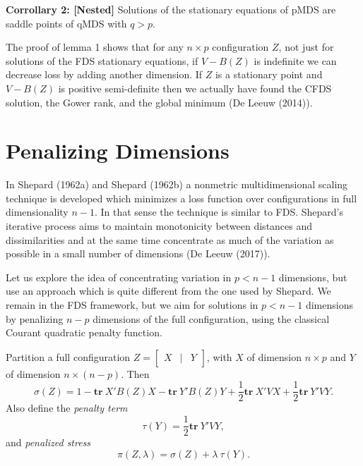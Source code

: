 \documentclass[
  12pt,
]{article}
\begin{document}
\textbf{Corrollary 2: {[}Nested{]}} Solutions of the stationary
equations of pMDS are saddle points of qMDS with \(q>p\).

The proof of lemma 1 shows that for any \(n\times p\) configuration
\(Z\), not just for solutions of the FDS stationary equations, if
\(V-B(Z)\) is indefinite we can decrease loss by adding another
dimension. If \(Z\) is a stationary point and \(V-B(Z)\) is positive
semi-definite then we actually have found the CFDS solution, the Gower
rank, and the global minimum (De Leeuw (2014)).

\section{Penalizing Dimensions}\label{penalizing-dimensions}

In Shepard (1962a) and Shepard (1962b) a nonmetric multidimensional
scaling technique is developed which minimizes a loss function over
configurations in full dimensionality \(n-1\). In that sense the
technique is similar to FDS. Shepard's iterative process aims to
maintain monotonicity between distances and dissimilarities and at the
same time concentrate as much of the variation as possible in a small
number of dimensions (De Leeuw (2017)).

Let us explore the idea of concentrating variation in \(p<n-1\)
dimensions, but use an approach which is quite different from the one
used by Shepard. We remain in the FDS framework, but we aim for
solutions in \(p<n-1\) dimensions by penalizing \(n-p\) dimensions of
the full configuration, using the classical Courant quadratic penalty
function.

Partition a full configuration
\(Z=\begin{bmatrix}X&\mid&Y\end{bmatrix}\), with \(X\) of dimension
\(n\times p\) and \(Y\) of dimension \(n\times(n-p)\). Then
\begin{equation}\label{E:part}   
\sigma(Z)=1-\mathbf{tr}\ X'B(Z)X - \mathbf{tr}\ Y'B(Z)Y+\frac12 \mathbf{tr}\ X'VX+\frac12 \mathbf{tr}\ Y'VY.
\end{equation} Also define the \emph{penalty term}
\begin{equation}\label{E:tau}
\tau(Y)=\frac12\mathbf{tr}\ Y'VY,
\end{equation} and \emph{penalized stress} \begin{equation}\label{E:pi}
\pi(Z,\lambda)=\sigma(Z)+\lambda\ \tau(Y).
\end{equation}
\end{document}
